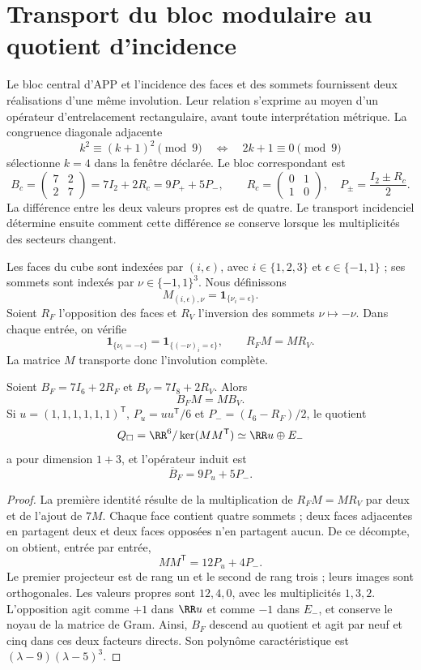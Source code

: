 \section{Transport du bloc modulaire au quotient d'incidence}
\label{sec:incidence-transport-new}
Le bloc central d'APP et l'incidence des faces et des sommets fournissent deux réalisations d'une même involution. Leur relation s'exprime au moyen d'un opérateur d'entrelacement rectangulaire, avant toute interprétation métrique. La congruence diagonale adjacente
\[
 k^2\equiv(k+1)^2\pmod9
 \quad\Longleftrightarrow\quad 2k+1\equiv0\pmod9
\]
sélectionne \(k=4\) dans la fenêtre déclarée. Le bloc correspondant est
\[
 B_c=\begin{pmatrix}7&2\\2&7\end{pmatrix}
 =7I_2+2R_c=9P_++5P_-,\qquad
 R_c=\begin{pmatrix}0&1\\1&0\end{pmatrix},\quad
 P_\pm=\frac{I_2\pm R_c}{2}.
\]
La différence entre les deux valeurs propres est de quatre. Le transport
incidenciel détermine ensuite comment cette différence se conserve
lorsque les multiplicités des secteurs changent.

Les faces du cube sont indexées par \((i,\epsilon)\), avec \(i\in\{1,2,3\}\) et \(\epsilon\in\{-1,1\}\) ; ses sommets sont indexés par \(\nu\in\{-1,1\}^3\). Nous définissons
\[
 M_{(i,\epsilon),\nu}=\mathbf1_{\{\nu_i=\epsilon\}}.
\]
Soient \(R_F\) l'opposition des faces et \(R_V\) l'inversion des sommets \(\nu\mapsto-\nu\). Dans chaque entrée, on vérifie
\[
 \mathbf1_{\{\nu_i=-\epsilon\}}
 =\mathbf1_{\{(-\nu)_i=\epsilon\}},\qquad R_FM=MR_V.
\]
La matrice \(M\) transporte donc l’involution complète.

\begin{theorem}
Soient \(B_F=7I_6+2R_F\) et \(B_V=7I_8+2R_V\). Alors
\[
 B_FM=MB_V.
\]
Si \(u=(1,1,1,1,1,1)^{\mathsf T}\),
\(P_u=uu^{\mathsf T}/6\) et \(P_-=(I_6-R_F)/2\), le quotient
\[
 Q_\square=\RR^6/\ker(MM^{\mathsf T})
 \simeq\RR u\oplus E_-
\]
a pour dimension \(1+3\), et l’opérateur induit est
\[
 \overline B_F=9P_u+5P_-.
\]
\end{theorem}
\begin{proof}
La première identité résulte de la multiplication de \(R_FM=MR_V\) par deux et de l'ajout de \(7M\). Chaque face contient quatre sommets ; deux faces adjacentes en partagent deux et deux faces opposées n'en partagent aucun. De ce décompte, on obtient, entrée par entrée,
\[
 MM^{\mathsf T}=12P_u+4P_-.
\]
Le premier projecteur est de rang un et le second de rang trois ; leurs images
sont orthogonales. Les valeurs propres sont \(12,4,0\), avec les multiplicités
\(1,3,2\). L’opposition agit comme \(+1\) dans \(\RR u\) et comme
\(-1\) dans \(E_-\), et conserve le noyau de la matrice de Gram. Ainsi,
\(B_F\) descend au quotient et agit par neuf et cinq dans ces deux
facteurs directs. Son polynôme caractéristique est
\((\lambda-9)(\lambda-5)^3\).
\end{proof}

